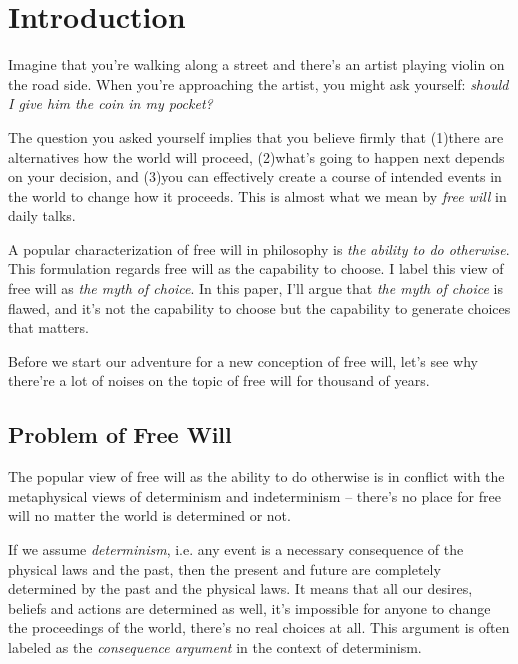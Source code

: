 \section{Introduction}

Imagine that you're walking along a street and there's an artist playing violin on the road side. When you're approaching the artist, you might ask yourself: \emph{should I give him the coin in my pocket?}

The question you asked yourself implies that you believe firmly that (1)there are alternatives how the world will proceed, (2)what's going to happen next depends on your decision, and (3)you can effectively create a course of intended events in the world to change how it proceeds. This is almost what we mean by \emph{free will} in daily talks.

A popular characterization of free will in philosophy is \emph{the ability to do otherwise}\cite{sep-freewill}. This formulation regards free will as the capability to choose. I label this view of free will as \emph{the myth of choice}. In this paper, I'll argue that \emph{the myth of choice} is flawed, and it's not the capability to choose but the capability to generate choices that matters.


Before we start our adventure for a new conception of free will, let's see why there're a lot of noises on the topic of free will for thousand of years.

\subsection{Problem of Free Will}

The popular view of free will as the ability to do otherwise is in conflict with the metaphysical views of determinism and indeterminism -- there’s no place for free will no matter the world is determined or not.

If we assume \emph{determinism}, i.e. any event is a necessary consequence of the physical laws and the past, then the present and future are completely determined by the past and the physical laws. It means that all our desires, beliefs and actions are determined as well, it’s impossible for anyone to change the proceedings of the world, there’s no real choices at all. This argument is often labeled as the \emph{consequence argument}\cite{sep-compatibilism} in the context of determinism.

